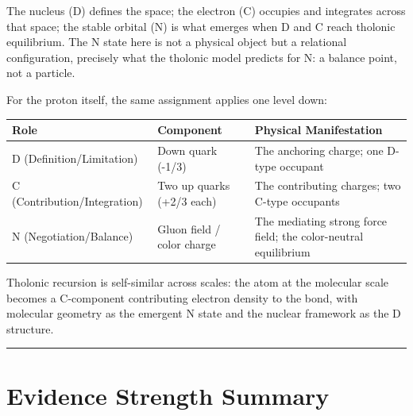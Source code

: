 \documentclass[12pt]{article}
\begin{document}
The nucleus (D) defines the space; the electron (C) occupies and
integrates across that space; the stable orbital (N) is what emerges
when D and C reach tholonic equilibrium. The N state here is not a
physical object but a relational configuration, precisely what the
tholonic model predicts for N: a balance point, not a particle.

For the proton itself, the same assignment applies one level down:

\begin{longtable}[]{@{}
  >{\raggedright\arraybackslash}p{}
  >{\raggedright\arraybackslash}p{}
  >{\raggedright\arraybackslash}p{}@{}}
\toprule\noalign{}
\begin{minipage}[b]{\linewidth}\raggedright
Role
\end{minipage} & \begin{minipage}[b]{\linewidth}\raggedright
Component
\end{minipage} & \begin{minipage}[b]{\linewidth}\raggedright
Physical Manifestation
\end{minipage} \\
\midrule\noalign{}
\endhead
\bottomrule\noalign{}
\endlastfoot
D (Definition/Limitation) & Down quark (-1/3) & The anchoring charge;
one D-type occupant \\
C (Contribution/Integration) & Two up quarks (+2/3 each) & The
contributing charges; two C-type occupants \\
N (Negotiation/Balance) & Gluon field / color charge & The mediating
strong force field; the color-neutral equilibrium \\
\end{longtable}

Tholonic recursion is self-similar across scales: the atom at the
molecular scale becomes a C-component contributing electron density to
the bond, with molecular geometry as the emergent N state and the
nuclear framework as the D structure.

\begin{center}\rule{0.5\linewidth}{0.5pt}\end{center}

\section{Evidence Strength Summary}\label{evidence-strength-summary}
\end{document}
